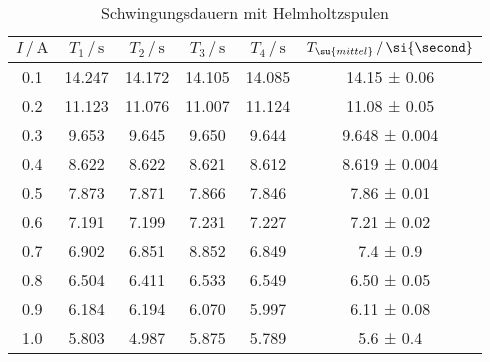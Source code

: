 \begin{table}[H]
  \centering
  \begin{tabular}{c| c c c c |c}
    \toprule
    $I\,/\,\si{\ampere}$ & $T_1\,/\,\si{\second}$ & $T_2\,/\,\si{\second}$ & $T_3\,/\,\si{\second}$ & $T_4\,/\,\si{\second}$
    & $T_\su{mittel}\,/\,\si{\second}$\\
    \midrule
    0.1 & 14.247 & 14.172 & 14.105 & 14.085 & 14.15 ± 0.06 \\
    0.2 & 11.123 & 11.076 & 11.007 & 11.124 & 11.08 ± 0.05\\
    0.3 &  9.653 & 9.645 & 9.650 & 9.644 &  9.648 ± 0.004  \\
    0.4 &  8.622 & 8.622 & 8.621 & 8.612 &  8.619 ± 0.004  \\
    0.5 &  7.873 & 7.871 & 7.866 & 7.846 &  7.86 ± 0.01  \\
    0.6 &  7.191 & 7.199 & 7.231 & 7.227 &  7.21 ± 0.02  \\
    0.7 &  6.902 & 6.851 & 8.852 & 6.849 &  7.4 ± 0.9  \\
    0.8 &  6.504 & 6.411 & 6.533 & 6.549 &  6.50 ± 0.05  \\
    0.9 &  6.184 & 6.194 & 6.070 & 5.997 &  6.11 ± 0.08  \\
    1.0 &  5.803 & 4.987 & 5.875 & 5.789 &  5.6 ± 0.4  \\
    \bottomrule
  \end{tabular}
  \caption{Schwingungsdauern mit Helmholtzspulen}
  \label{tab:helm}
\end{table}

